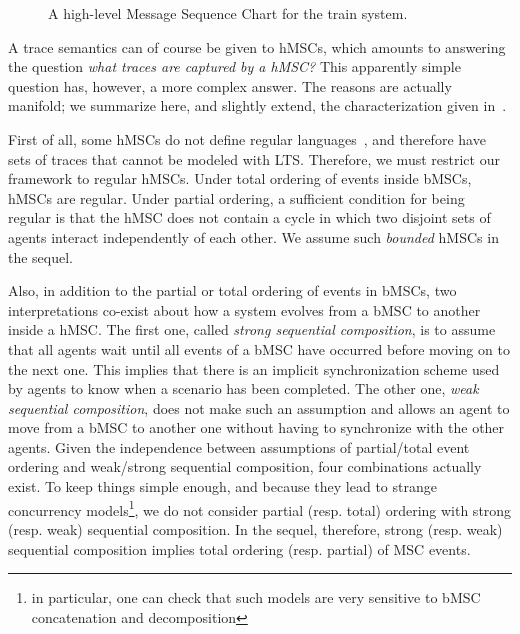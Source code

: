 \vspace{0.4cm}
\begin{figure}[H]\centering
{}
\caption{A high-level Message Sequence Chart for the train system.\label{image:train-hmsc}}
\end{figure}

A trace semantics can of course be given to hMSCs, which amounts to answering the question \emph{what traces are captured by a hMSC?} This apparently simple question has, however, a more complex answer. The reasons are actually manifold; we summarize here, and slightly extend, the characterization given in~\cite{Uchitel:2004}.

First of all, some hMSCs do not define regular languages~\cite{Henriksen:2000}, and therefore have sets of traces that cannot be modeled with LTS. Therefore, we must restrict our framework to regular hMSCs. Under total ordering of events inside bMSCs, hMSCs are regular. Under partial ordering, a sufficient condition for being regular is that the hMSC does not contain a cycle in which two disjoint sets of agents interact independently of each other. We assume such \emph{bounded} hMSCs in the sequel. 

Also, in addition to the partial or total ordering of events in bMSCs, two interpretations co-exist about how a system evolves from a bMSC to another inside a hMSC. The first one, called \emph{strong sequential composition}, is to assume that all agents wait until all events of a bMSC have occurred before moving on to the next one. This implies that there is an implicit synchronization scheme used by agents to know when a scenario has been completed. The other one, \emph{weak sequential composition}, does not make such an assumption and allows an agent to move from a bMSC to another one without having to synchronize with the other agents. Given the independence between assumptions of partial/total event ordering and weak/strong sequential composition, four combinations actually exist. To keep things simple enough, and because they lead to strange concurrency models\footnote{in particular, one can check that such models are very sensitive to bMSC concatenation and decomposition}, we do not consider partial (resp. total) ordering with strong (resp. weak) sequential composition. In the sequel, therefore, strong (resp. weak) sequential composition implies total ordering (resp. partial) of MSC events.

